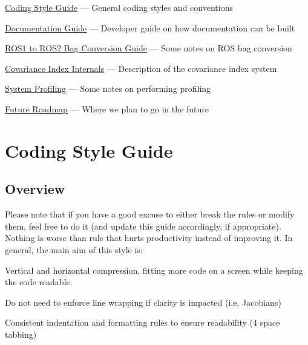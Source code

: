 
\begin{DoxyItemize}
\item \hyperlink{dev-coding-style}{Coding Style Guide} --- General coding styles and conventions
\item \hyperlink{dev-docs}{Documentation Guide} --- Developer guide on how documentation can be built
\item \hyperlink{dev-ros1-to-ros2}{R\+O\+S1 to R\+O\+S2 Bag Conversion Guide} --- Some notes on R\+OS bag conversion
\item \hyperlink{dev-index}{Covariance Index Internals} --- Description of the covariance index system
\item \hyperlink{dev-profiling}{System Profiling} --- Some notes on performing profiling
\item \hyperlink{dev-roadmap}{Future Roadmap} --- Where we plan to go in the future 
\end{DoxyItemize}\hypertarget{dev-coding-style}{}\section{Coding Style Guide}\label{dev-coding-style}
\hypertarget{dev-coding-style_coding-style-overview}{}\subsection{Overview}\label{dev-coding-style_coding-style-overview}
Please note that if you have a good excuse to either break the rules or modify them, feel free to do it (and update this guide accordingly, if appropriate). Nothing is worse than rule that hurts productivity instead of improving it. In general, the main aim of this style is\+:


\begin{DoxyItemize}
\item Vertical and horizontal compression, fitting more code on a screen while keeping the code readable.
\item Do not need to enforce line wrapping if clarity is impacted (i.\+e. Jacobians)
\item Consistent indentation and formatting rules to ensure readability (4 space tabbing)
\end{DoxyItemize}


